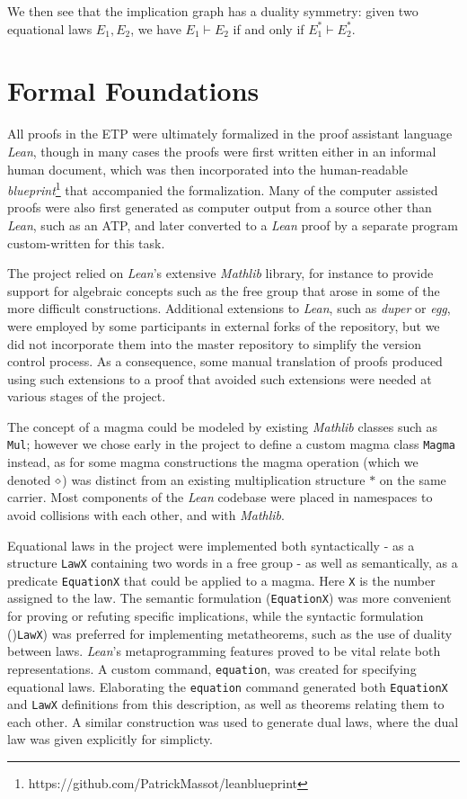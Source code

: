 We then see that the implication graph has a duality symmetry: given two equational laws $E_1,E_2$, we have $E_1 \vdash E_2$ if and only if $E_1^* \vdash E_2^*$.

\section{Formal Foundations}


All proofs in the ETP were ultimately formalized in the proof assistant language \emph{Lean}, though in many cases the proofs were first written either in an informal human document, which was then incorporated into the human-readable \emph{blueprint}\footnote{https://github.com/PatrickMassot/leanblueprint} that accompanied the formalization.  Many of the computer assisted proofs were also first generated as computer output from a source other than \emph{Lean}, such as an ATP, and later converted to a \emph{Lean} proof by a separate program custom-written for this task.

The project relied on \emph{Lean}'s extensive \emph{Mathlib} library, for instance to provide support for algebraic concepts such as the free group that arose in some of the more difficult constructions.  Additional extensions to \emph{Lean}, such as \emph{duper} or \emph{egg}, were employed by some participants in external forks of the repository, but we did not incorporate them into the master repository to simplify the version control process.  As a consequence, some manual translation of proofs produced using such extensions to a proof that avoided such extensions were needed at various stages of the project.

The concept of a magma could be modeled by existing \emph{Mathlib} classes such as \texttt{Mul}; however we chose early in the project to define a custom magma class \texttt{Magma} instead, as for some magma constructions the magma operation (which we denoted $\diamond$) was distinct from an existing multiplication structure $*$ on the same carrier.  Most components of the \emph{Lean} codebase were placed in namespaces to avoid collisions with each other, and with \emph{Mathlib}.

Equational laws in the project were implemented both syntactically - as a structure \texttt{LawX} containing two words in a free group - as well as semantically, as a predicate \texttt{EquationX} that could be applied to a magma. Here \texttt{X} is the number assigned to the law. The semantic formulation (\texttt{EquationX}) was more convenient for proving or refuting specific implications, while the syntactic formulation ()\texttt{LawX}) was preferred for implementing metatheorems, such as the use of duality between laws. \emph{Lean}'s metaprogramming features proved to be vital relate both representations. A custom command, \texttt{equation}, was created for specifying equational laws. Elaborating the \texttt{equation} command generated both \texttt{EquationX} and \texttt{LawX} definitions from this description, as well as theorems relating them to each other. A similar construction was used to generate dual laws, where the dual law was given explicitly for simplicty.

